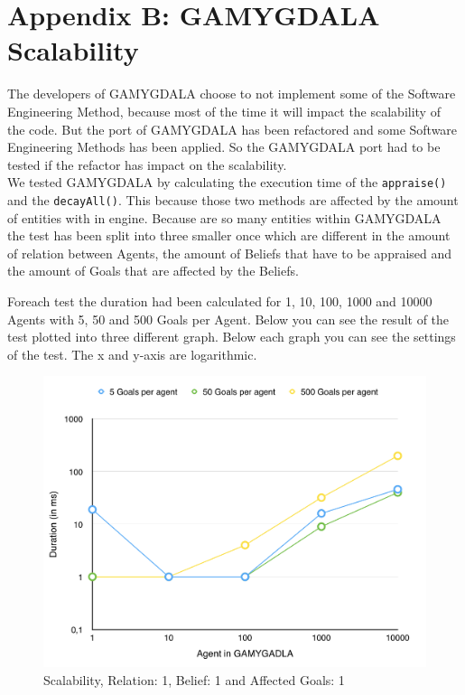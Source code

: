 \section{Appendix B: GAMYGDALA Scalability}
The developers of GAMYGDALA choose to not implement some of the Software Engineering Method, because most of the time it will impact the scalability of the code.
But the port of GAMYGDALA has been refactored and some Software Engineering Methods has been applied. So the GAMYGDALA port had to be tested if the refactor has impact on the scalability. \\

We tested GAMYGDALA by calculating the execution time of the \texttt{appraise()} and the \texttt{decayAll()}. This because those two methods are affected by the amount of entities with in engine. Because are so many entities within GAMYGDALA the test has been split into three smaller once which are different in the amount of relation between Agents, the amount of Beliefs that have to be appraised and the amount of Goals that are affected by the Beliefs.

Foreach test the duration had been calculated for 1, 10, 100, 1000 and 10000 Agents with 5, 50 and 500 Goals per Agent. Below you can see the result of the test plotted into three different graph. Below each graph you can see the settings of the test. The x and y-axis are logarithmic.

\begin{figure}[H]
  \centering
  \includegraphics[scale=0.5]{scalability/1.jpg}
  \caption{Scalability, Relation: 1, Belief: 1 and Affected Goals: 1}
  \label{scala:first}
\end{figure}

